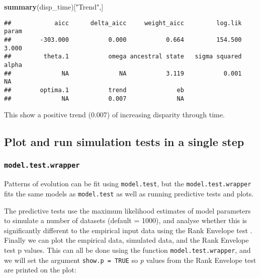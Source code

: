 \documentclass[
]{book}
\newenvironment{Shaded}{\begin{snugshade}}{\end{snugshade}}
\newcommand{\FunctionTok}[1]{\textcolor[rgb]{0.13,0.29,0.53}{\textbf{#1}}}
\newcommand{\NormalTok}[1]{#1}
\newcommand{\StringTok}[1]{\textcolor[rgb]{0.31,0.60,0.02}{#1}}
\begin{document}
\begin{Shaded}
\begin{Highlighting}[]
\FunctionTok{summary}\NormalTok{(disp\_time)[}\StringTok{"Trend"}\NormalTok{,]}
\end{Highlighting}
\end{Shaded}

\begin{verbatim}
##            aicc      delta_aicc     weight_aicc         log.lik           param 
##        -303.000           0.000           0.664         154.500           3.000 
##         theta.1           omega ancestral state   sigma squared           alpha 
##              NA              NA           3.119           0.001              NA 
##        optima.1           trend              eb 
##              NA           0.007              NA
\end{verbatim}

This show a positive trend (0.007) of increasing disparity through time.

\hypertarget{plot-and-run-simulation-tests-in-a-single-step}{%
\subsection{Plot and run simulation tests in a single step}\label{plot-and-run-simulation-tests-in-a-single-step}}

\hypertarget{model.test.wrapper}{%
\subsubsection{\texorpdfstring{\texttt{model.test.wrapper}}{model.test.wrapper}}\label{model.test.wrapper}}

Patterns of evolution can be fit using \texttt{model.test}, but the \texttt{model.test.wrapper} fits the same models as \texttt{model.test} as well as running predictive tests and plots.

The predictive tests use the maximum likelihood estimates of model parameters to simulate a number of datasets (default = 1000), and analyse whether this is significantly different to the empirical input data using the Rank Envelope test \citep{murrell2018global}.
Finally we can plot the empirical data, simulated data, and the Rank Envelope test p values.
This can all be done using the function \texttt{model.test.wrapper}, and we will set the argument \texttt{show.p\ =\ TRUE} so \emph{p} values from the Rank Envelope test are printed on the plot:
\end{document}
